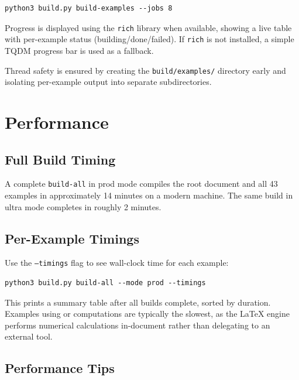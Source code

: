 \begin{verbatim}
python3 build.py build-examples --jobs 8
\end{verbatim}

Progress is displayed using the \texttt{rich} library when available, showing a
live table with per-example status (building/done/failed).  If \texttt{rich}
is not installed, a simple TQDM progress bar is used as a fallback.

Thread safety is ensured by creating the \texttt{build/examples/} directory
early and isolating per-example output into separate subdirectories.

\section{Performance}
\label{sec:build-performance}

\subsection{Full Build Timing}

A complete \texttt{build-all} in \textsf{prod} mode compiles the root document
and all 43 examples in approximately 14 minutes on a modern machine.  The same
build in \textsf{ultra} mode completes in roughly 2 minutes.

\subsection{Per-Example Timings}

Use the \texttt{--timings} flag to see wall-clock time for each example:

\begin{verbatim}
python3 build.py build-all --mode prod --timings
\end{verbatim}

This prints a summary table after all builds complete, sorted by duration.
Examples using  or  computations are
typically the slowest, as the \LaTeX{} engine performs numerical calculations
in-document rather than delegating to an external tool.

\subsection{Performance Tips}

